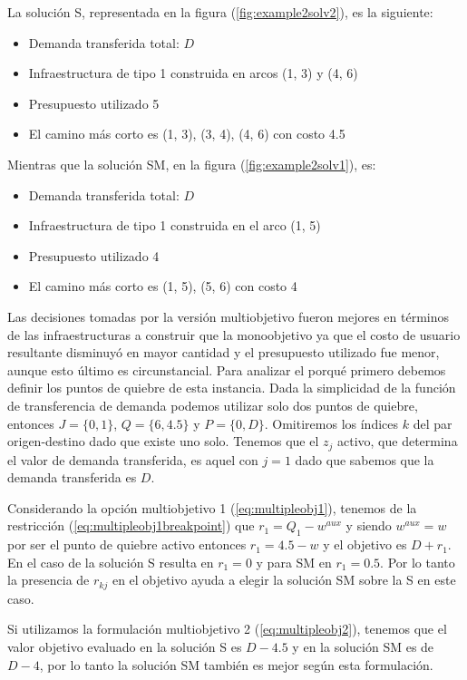 \documentclass{article}
\begin{document}
  La solución S, representada en la figura (\ref{fig:example2solv2}), es la siguiente:

  \begin{itemize}
    \item{Demanda transferida total: $D$}
    \item{Infraestructura de tipo 1 construida en arcos (1, 3) y (4, 6)}
    \item{Presupuesto utilizado 5}
    \item{El camino más corto es (1, 3), (3, 4), (4, 6) con costo 4.5}
  \end{itemize}

  Mientras que la solución SM, en la figura (\ref{fig:example2solv1}), es:

  \begin{itemize}
    \item{Demanda transferida total: $D$}
    \item{Infraestructura de tipo 1 construida en el arco (1, 5)}
    \item{Presupuesto utilizado 4}
    \item{El camino más corto es (1, 5), (5, 6) con costo 4}
  \end{itemize}

  Las decisiones tomadas por la versión multiobjetivo fueron mejores en términos de las infraestructuras a construir que la monoobjetivo ya que el costo de usuario resultante disminuyó en mayor cantidad y el presupuesto utilizado fue menor, aunque esto último es circunstancial. Para analizar el porqué primero debemos definir los puntos de quiebre de esta instancia. Dada la simplicidad de la función de transferencia de demanda podemos utilizar solo dos puntos de quiebre, entonces $J = \{0, 1\}$, $Q = \{6, 4.5\}$ y $P = \{0, D\}$. Omitiremos los índices $k$ del par origen-destino dado que existe uno solo. Tenemos que el $z_j$ activo, que determina el valor de demanda transferida, es aquel con $j = 1$ dado que sabemos que la demanda transferida es $D$.

  Considerando la opción multiobjetivo 1 (\ref{eq:multipleobj1}), tenemos de la restricción (\ref{eq:multipleobj1breakpoint}) que $r_1 = Q_1 - w^{aux}$ y siendo $w^{aux} = w$ por ser el punto de quiebre activo entonces $r_1 = 4.5 - w$ y el objetivo es $D + r_1$. En el caso de la solución S resulta en $r_1 = 0$ y para SM en $r_1 = 0.5$. Por lo tanto la presencia de $r_{kj}$ en el objetivo ayuda a elegir la solución SM sobre la S en este caso.

  Si utilizamos la formulación multiobjetivo 2 (\ref{eq:multipleobj2}), tenemos que el valor objetivo evaluado en la solución S es $D - 4.5$ y en la solución SM es de $D - 4$, por lo tanto la solución SM también es mejor según esta formulación.
\end{document}
